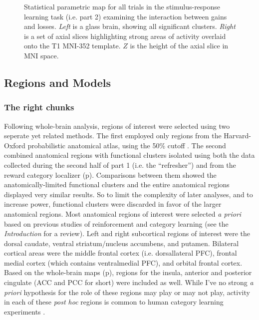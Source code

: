 \documentclass[doc,12pt]{apa}        %
\begin{document}
\begin{figure}[tp]
    \centering
	\caption{Statistical parametric map for all trials in the stimulus-response learning task (i.e. part 2) examining the interaction between gains and losses.  \emph{Left} is a glass brain, showing all significant clusters.  \emph{Right} is a set of axial slices highlighting strong areas of activity overlaid onto the T1 MNI-352 template.  $Z$ is the height of the axial slice in MNI space.}
	\label{fig:gxl}
\end{figure}

\subsection{Regions and Models}
\label{sub:regoins}
\subsubsection{The right chunks}
\label{subsub:chunks}
Following whole-brain analysis, regions of interest were selected using two seperate yet related methods.  The first employed only regions from the Harvard-Oxford probabilistic anatomical atlas, using the 50\% cutoff \cite{Desikan:2006p9370}.  The second combined anatomical regions with functional clusters isolated using both the data collected during the second half of part 1 (i.e. the ``refresher'') and from the reward category localizer (p\pageref{subsub:datadetails}).  Comparisons between them showed the anatomically-limited functional clusters and the entire anatomical regions displayed very similar results.  So to limit the complexity of later analyses, and to increase power, functional clusters were discarded in favor of the larger anatomical regions.  Most anatomical regions of interest were selected \emph{a priori} based on previous studies of reinforcement and category learning (see the \emph{Introduction} for a review).  Left and right subcortical regions of interest were the dorsal caudate, ventral striatum/nucleus accumbens, and putamen.   Bilateral cortical areas were the middle frontal cortex (i.e. dorsallateral PFC), frontal medial cortex (which contains ventralmedial PFC), and orbital frontal cortex.  Based on the whole-brain maps (p\pageref{sub:blob}), regions for the insula, anterior and posterior cingulate (ACC and PCC for short) were included as well. While I've no strong \emph{a priori} hypothesis for the role of these regions may play or may not play, activity in each of these \emph{post hoc} regions is common to human category learning experiments \cite{LopezPaniagua:2011p8296,Seger:2010p7188,Cincotta:2007p6672,Seger:2006p5447,Seger:2005pd}.
\end{document}
